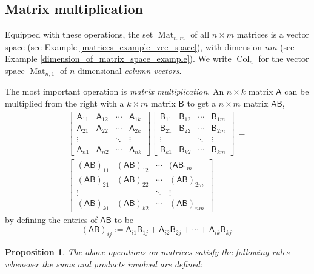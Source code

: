 \documentclass[a4paper,11pt]{book}
\newtheorem{proposition}[theorem]{Proposition}
\theoremstyle{definition}
\newcommand{\mat}[1]{\mathsf{#1}}
\DeclareMathOperator{\Mat}{Mat}
\DeclareMathOperator{\Col}{Col}
\begin{document}
\begin{appendices}
\subsection{Matrix multiplication}

Equipped with these operations, the set $\Mat_{n, m}$ of all $n \times m$ matrices is a vector space (see Example \ref{matrices_example_vec_space}), with dimension $nm$ (see Example \ref{dimension_of_matrix_space_example}). We write $\Col_n$ for the vector space $\Mat_{n,1}$ of $n$-dimensional {\em column vectors}.

The most important operation is {\em matrix multiplication}. An $n \times k$ matrix $\mat{A}$ can be multiplied from the right with a $k \times m$ matrix $\mat{B}$ to get a $n \times m$ matrix $\mat{AB}$,
\begin{multline*}
\left[ \begin{array}{cccc} \mat{A}_{11} & \mat{A}_{12} & \cdots & \mat{A}_{1k} \\
 \mat{A}_{21} & \mat{A}_{22} & \cdots & \mat{A}_{2k} \\
 \vdots & & \ddots & \vdots \\
 \mat{A}_{n1} & \mat{A}_{n2} & \cdots & \mat{A}_{nk} \end{array} \right] \left[ \begin{array}{cccc} \mat{B}_{11} & \mat{B}_{12} & \cdots & \mat{B}_{1m} \\
 \mat{B}_{21} & \mat{B}_{22} & \cdots & \mat{B}_{2m} \\
 \vdots & & \ddots & \vdots \\
 \mat{B}_{k1} & \mat{B}_{k2} & \cdots & \mat{B}_{km} \end{array} \right] \, = \\ 
\left[ \begin{array}{cccc} (\mat{AB})_{11} & (\mat{AB})_{12} & \cdots & (\mat{AB}_{1m} \\
 (\mat{AB})_{21} & (\mat{AB})_{22} & \cdots & (\mat{AB})_{2m} \\
 \vdots & & \ddots & \vdots \\
 (\mat{AB})_{k1} & (\mat{AB})_{k2} & \cdots & (\mat{AB})_{nm} \end{array} \right] 
\end{multline*}
by defining the entries of $\mat{AB}$ to be
\[
 (\mat{AB})_{ij} := \mat{A}_{i1} \mat{B}_{1j} + \mat{A}_{i2} \mat{B}_{2j} + \cdots + \mat{A}_{ik} \mat{B}_{kj}. 
\]
\begin{proposition} \label{props_of_matrix_ops} The above operations on matrices satisfy the following rules whenever the sums and products involved are defined:

\end{proposition}
\end{appendices}
\end{document}
